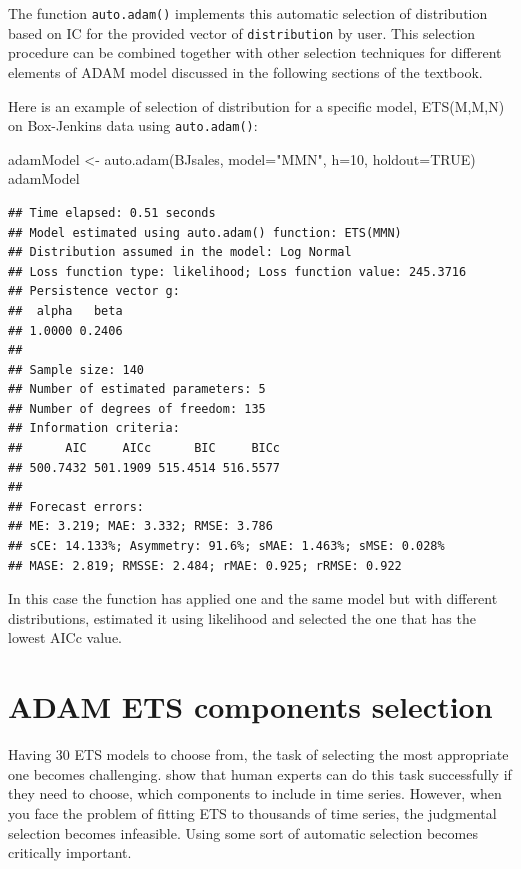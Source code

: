 \documentclass[
]{book}
\newenvironment{Shaded}{\begin{snugshade}}{\end{snugshade}}
\newcommand{\AttributeTok}[1]{\textcolor[rgb]{0.77,0.63,0.00}{#1}}
\newcommand{\ConstantTok}[1]{\textcolor[rgb]{0.00,0.00,0.00}{#1}}
\newcommand{\DecValTok}[1]{\textcolor[rgb]{0.00,0.00,0.81}{#1}}
\newcommand{\FunctionTok}[1]{\textcolor[rgb]{0.00,0.00,0.00}{#1}}
\newcommand{\NormalTok}[1]{#1}
\newcommand{\OtherTok}[1]{\textcolor[rgb]{0.56,0.35,0.01}{#1}}
\newcommand{\StringTok}[1]{\textcolor[rgb]{0.31,0.60,0.02}{#1}}
\theoremstyle{definition}
\theoremstyle{definition}
\theoremstyle{definition}
\theoremstyle{definition}
\theoremstyle{remark}
\begin{document}
The function \texttt{auto.adam()} implements this automatic selection of distribution based on IC for the provided vector of \texttt{distribution} by user. This selection procedure can be combined together with other selection techniques for different elements of ADAM model discussed in the following sections of the textbook.

Here is an example of selection of distribution for a specific model, ETS(M,M,N) on Box-Jenkins data using \texttt{auto.adam()}:

\begin{Shaded}
\begin{Highlighting}[]
\NormalTok{adamModel }\OtherTok{\textless{}{-}} \FunctionTok{auto.adam}\NormalTok{(BJsales, }\AttributeTok{model=}\StringTok{"MMN"}\NormalTok{, }\AttributeTok{h=}\DecValTok{10}\NormalTok{, }\AttributeTok{holdout=}\ConstantTok{TRUE}\NormalTok{)}
\NormalTok{adamModel}
\end{Highlighting}
\end{Shaded}

\begin{verbatim}
## Time elapsed: 0.51 seconds
## Model estimated using auto.adam() function: ETS(MMN)
## Distribution assumed in the model: Log Normal
## Loss function type: likelihood; Loss function value: 245.3716
## Persistence vector g:
##  alpha   beta 
## 1.0000 0.2406 
## 
## Sample size: 140
## Number of estimated parameters: 5
## Number of degrees of freedom: 135
## Information criteria:
##      AIC     AICc      BIC     BICc 
## 500.7432 501.1909 515.4514 516.5577 
## 
## Forecast errors:
## ME: 3.219; MAE: 3.332; RMSE: 3.786
## sCE: 14.133%; Asymmetry: 91.6%; sMAE: 1.463%; sMSE: 0.028%
## MASE: 2.819; RMSSE: 2.484; rMAE: 0.925; rRMSE: 0.922
\end{verbatim}

In this case the function has applied one and the same model but with different distributions, estimated it using likelihood and selected the one that has the lowest AICc value.

\hypertarget{ETSSelection}{%
\section{ADAM ETS components selection}\label{ETSSelection}}

Having 30 ETS models to choose from, the task of selecting the most appropriate one becomes challenging. \citet{Petropoulos2018a} show that human experts can do this task successfully if they need to choose, which components to include in time series. However, when you face the problem of fitting ETS to thousands of time series, the judgmental selection becomes infeasible. Using some sort of automatic selection becomes critically important.
\end{document}
